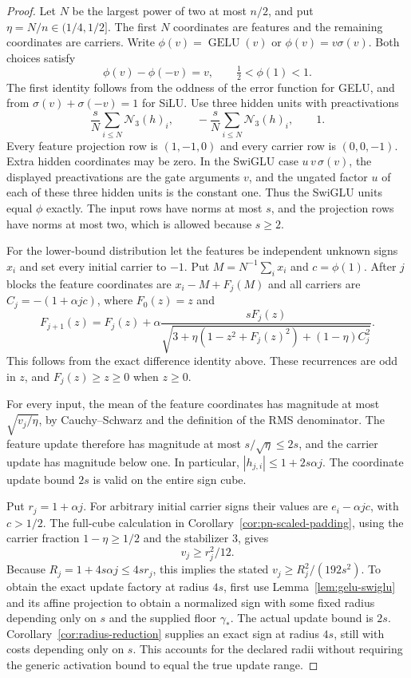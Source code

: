 \begin{proof}
Let $N$ be the largest power of two at most $n/2$, and put
$\eta=N/n\in(1/4,1/2]$. The first $N$ coordinates are features and
the remaining coordinates are carriers. Write
$\phi(v)=\operatorname{GELU}(v)$ or $\phi(v)=v\sigma(v)$.
Both choices satisfy
\[
 \phi(v)-\phi(-v)=v,\qquad \tfrac12<\phi(1)<1.
\]
The first identity follows from the oddness of the error function for
GELU, and from $\sigma(v)+\sigma(-v)=1$ for SiLU. Use three hidden
units with preactivations
\[
  \frac{s}{N}\sum_{i\le N}\mathcal N_3(h)_i,\qquad
  -\frac{s}{N}\sum_{i\le N}\mathcal N_3(h)_i,\qquad 1.
\]
Every feature projection row is $(1,-1,0)$ and every carrier row is
$(0,0,-1)$. Extra hidden coordinates may be zero. In the SwiGLU case
$u\,v\,\sigma(v)$, the displayed preactivations are the gate arguments
$v$, and the ungated factor $u$ of each of these three hidden units is
the constant one. Thus the SwiGLU units equal $\phi$ exactly. The
input rows have norms at most $s$, and the projection rows have norms
at most two, which is allowed because $s\ge2$.

For the lower-bound distribution let the features be independent
unknown signs $x_i$ and set every initial carrier to $-1$. Put
$M=N^{-1}\sum_i x_i$ and $c=\phi(1)$. After $j$ blocks the feature
coordinates are $x_i-M+F_j(M)$ and all carriers are
$C_j=-(1+\alpha jc)$, where $F_0(z)=z$ and
\[
 F_{j+1}(z)=F_j(z)+\alpha
 \frac{sF_j(z)}{
 \sqrt{3+\eta(1-z^2+F_j(z)^2)+(1-\eta)C_j^2}}.
\]
This follows from the exact difference identity above. These
recurrences are odd in $z$, and $F_j(z)\ge z\ge0$ when $z\ge0$.

For every input, the mean of the feature coordinates has magnitude at
most $\sqrt{v_j/\eta}$, by Cauchy--Schwarz and the definition of the
RMS denominator. The feature update therefore has magnitude at most
$s/\sqrt\eta\le2s$, and the carrier update has magnitude below one.
In particular, $|h_{j,i}|\le1+2s\alpha j$. The coordinate update
bound $2s$ is valid on the entire sign cube.

Put $r_j=1+\alpha j$. For arbitrary initial carrier signs their values
are $e_i-\alpha jc$, with $c>1/2$. The full-cube calculation in
Corollary~\ref{cor:pn-scaled-padding}, using the carrier fraction
$1-\eta\ge1/2$ and the stabilizer $3$, gives
\[
 v_j\ge r_j^2/12.
\]
Because $R_j=1+4s\alpha j\le4sr_j$, this implies the stated
$v_j\ge R_j^2/(192s^2)$. To obtain the exact update factory at radius
$4s$, first use Lemma~\ref{lem:gelu-swiglu} and its affine projection
to obtain a normalized sign with some fixed radius depending only
on $s$ and the supplied floor $\gamma_*$. The actual update bound is
$2s$. Corollary~\ref{cor:radius-reduction} supplies an exact sign at
radius $4s$, still with costs depending only on $s$. This accounts
for the declared radii without requiring the generic activation
bound to equal the true update range.


\end{proof}
